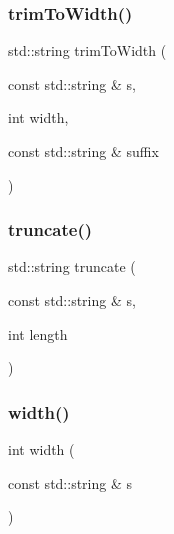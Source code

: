 \subsubsection{\texorpdfstring{trim\+To\+Width()}{trimToWidth()}}
{\footnotesize\ttfamily std\+::string trim\+To\+Width (\begin{DoxyParamCaption}\item[{const std\+::string \&}]{s,  }\item[{int}]{width,  }\item[{const std\+::string \&}]{suffix }\end{DoxyParamCaption})}

\mbox{\label{namespacestringutils_a8ad4fa6966778fa36685ad0e5d6fbfe4}} 
\subsubsection{\texorpdfstring{truncate()}{truncate()}}
{\footnotesize\ttfamily std\+::string truncate (\begin{DoxyParamCaption}\item[{const std\+::string \&}]{s,  }\item[{int}]{length }\end{DoxyParamCaption})}

\mbox{\label{namespacestringutils_a24e5e1105ba0113729cd02019020cae9}} 
\subsubsection{\texorpdfstring{width()}{width()}}
{\footnotesize\ttfamily int width (\begin{DoxyParamCaption}\item[{const std\+::string \&}]{s }\end{DoxyParamCaption})}

